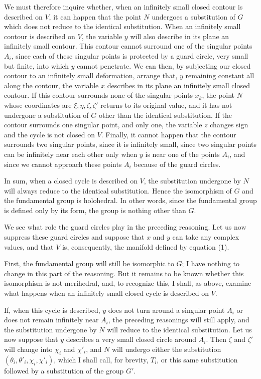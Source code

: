 \documentclass{article}
\begin{document}
We must therefore inquire whether, when an infinitely small closed contour is described on $V$, it can happen that the point $N$ undergoes a substitution of $G$ which does not reduce to the identical substitution. When an infinitely small contour is described on $V$, the variable $y$ will also describe in its plane an infinitely small contour. This contour cannot surround one of the singular points $A_{i}$, since each of these singular points is protected by a guard circle, very small but finite, into which $y$ cannot penetrate. We can then, by subjecting our closed contour to an infinitely small deformation, arrange that, $y$ remaining constant all along the contour, the variable $x$ describes in its plane an infinitely small closed contour. If this contour surrounds none of the singular points $x_{k}$, the point $N$ whose coordinates are $\xi, \eta, \zeta, \zeta'$ returns to its original value, and it has not undergone a substitution of $G$ other than the identical substitution. If the contour surrounds one singular point, and only one, the variable $z$ changes sign and the cycle is not closed on $V$. Finally, it cannot happen that the contour surrounds two singular points, since it is infinitely small, since two singular points can be infinitely near each other
only when $y$ is near one of the points $A_{i}$, and since we cannot approach these points $A_{i}$ because of the guard circles.

In sum, when a closed cycle is described on $V$, the substitution undergone by $N$ will always reduce to the identical substitution. Hence the isomorphism of $G$ and the fundamental group is holohedral. In other words, since the fundamental group is defined only by its form, the group is nothing other than $G$.

We see what role the guard circles play in the preceding reasoning. Let us now suppress these guard circles and suppose that $x$ and $y$ can take any complex values, and that $V$ is, consequently, the manifold defined by equation (1).

First, the fundamental group will still be isomorphic to $G$; I have nothing to change in this part of the reasoning. But it remains to be known whether this isomorphism is not merihedral, and, to recognize this, I shall, as above, examine what happens when an infinitely small closed cycle is described on $V$.

If, when this cycle is described, $y$ does not turn around a singular point $A_{i}$ or does not remain infinitely near $A_{i}$, the preceding reasonings will still apply, and the substitution undergone by $N$ will reduce to the identical substitution. Let us now suppose that $y$ describes a very small closed circle around $A_{i}$. Then $\zeta$ and $\zeta'$ will change into $\chi_{i}$ and $\chi'_{i}$, and $N$ will undergo either the substitution $(\theta_{i}, \theta'_{i}, \chi_{i}, \chi'_{i})$, which I shall call, for brevity, $T_{i}$, or this same substitution followed by a substitution of the group $G'$.
\end{document}
